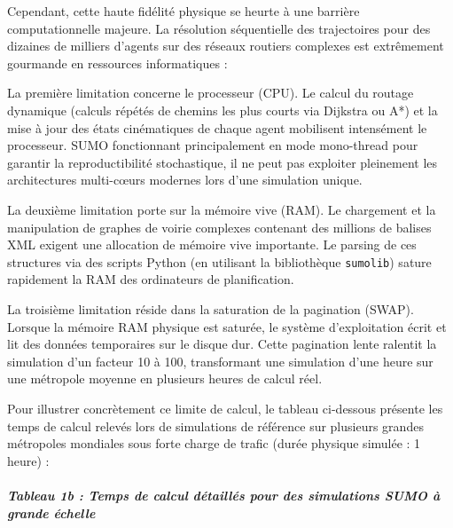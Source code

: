 \documentclass[10pt, a4paper]{article}
\begin{document}
Cependant, cette haute fidélité physique se heurte à une barrière
computationnelle majeure. La résolution séquentielle des trajectoires
pour des dizaines de milliers d'agents sur des réseaux routiers
complexes est extrêmement gourmande en ressources informatiques :

La première limitation concerne le processeur (CPU). Le calcul du
routage dynamique (calculs répétés de chemins les plus courts via
Dijkstra ou A*) et la mise à jour des états cinématiques de chaque agent
mobilisent intensément le processeur. SUMO fonctionnant principalement
en mode mono-thread pour garantir la reproductibilité stochastique, il
ne peut pas exploiter pleinement les architectures multi-cœurs modernes
lors d'une simulation unique.

La deuxième limitation porte sur la mémoire vive (RAM). Le chargement et
la manipulation de graphes de voirie complexes contenant des millions de
balises XML exigent une allocation de mémoire vive importante. Le
parsing de ces structures via des scripts Python (en utilisant la
bibliothèque \texttt{sumolib}) sature rapidement la RAM des ordinateurs
de planification.

La troisième limitation réside dans la saturation de la pagination
(SWAP). Lorsque la mémoire RAM physique est saturée, le système
d'exploitation écrit et lit des données temporaires sur le disque dur.
Cette pagination lente ralentit la simulation d'un facteur 10 à 100,
transformant une simulation d'une heure sur une métropole moyenne en
plusieurs heures de calcul réel.

Pour illustrer concrètement ce limite de calcul, le tableau ci-dessous
présente les temps de calcul relevés lors de simulations de référence
sur plusieurs grandes métropoles mondiales sous forte charge de trafic
(durée physique simulée : 1 heure) :

\subparagraph{Tableau 1b : Temps de calcul détaillés pour des
simulations SUMO à grande
échelle}\label{tableau-1b-temps-de-calcul-duxe9tailluxe9s-pour-des-simulations-sumo-uxe0-grande-uxe9chelle}
\end{document}
